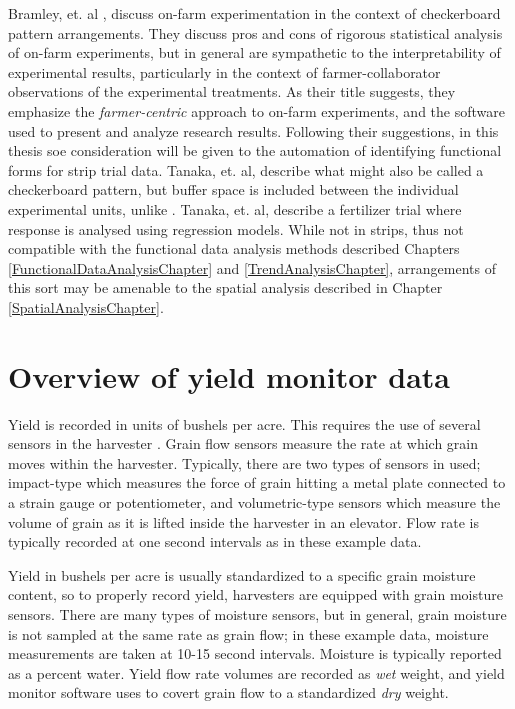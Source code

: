 \documentclass[phdcss]{SDSUThesis}
\begin{document}
Bramley, et. al \cite{bramley-10-2022}, discuss on-farm experimentation in the context of checkerboard pattern arrangements. They discuss pros and cons of rigorous statistical analysis of on-farm experiments, but in general are sympathetic to the interpretability of experimental results, particularly in the context of farmer-collaborator observations of the experimental treatments. As their title suggests, they emphasize the \textit{farmer-centric} approach to on-farm experiments, and the software used to present and analyze research results. Following their suggestions, in this thesis soe consideration will be given to the automation of identifying functional forms for strip trial data. Tanaka, et. al, \cite{tanaka-05-2023} describe what might also be called a checkerboard pattern, but buffer space is included between the individual experimental units, unlike \cite{bramley-10-2022}. Tanaka, et. al, describe a fertilizer trial where response is analysed using regression models. While not in strips, thus not compatible with the functional data analysis methods described Chapters \ref{FunctionalDataAnalysisChapter} and \ref{TrendAnalysisChapter}, arrangements of this sort may be amenable to the spatial analysis described in Chapter \ref{SpatialAnalysisChapter}.

\clearpage

\section{Overview of yield monitor data}\label{YieldMonitorOverview}

Yield is recorded in units of bushels per acre. This requires the use of several sensors in the harvester \cite{grisso-2009, whelan-2013, luck-2014}. Grain flow sensors measure the rate at which grain moves within the harvester. Typically, there are two types of sensors in used; impact-type which measures the force of grain hitting a metal plate connected to a strain gauge or potentiometer, and volumetric-type sensors which measure the volume of grain as it is lifted inside the harvester in an elevator. Flow rate is typically recorded at one second intervals as in these example data.

Yield in bushels per acre is usually standardized to a specific grain moisture content, so to properly record yield, harvesters are equipped with grain moisture sensors. There are many types of moisture sensors, but in general, grain moisture is not sampled at the same rate as grain flow; in these example data, moisture measurements are taken at 10-15 second intervals. Moisture is typically reported as a percent water. Yield flow rate volumes are recorded as \textit{wet} weight, and yield monitor software uses to covert grain flow to a standardized \textit{dry} weight.
\end{document}
